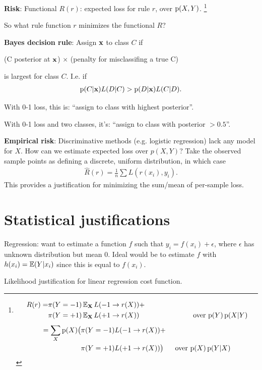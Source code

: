 \documentclass[12pt]{article}
\begin{document}
\textbf{Risk}: Functional $R(r)$: expected loss for rule $r$, over $\operatorname{\text{p}}(X, Y)$.
\footnote{
\begin{align*}
  R(r) = &\pi(Y=-1)\operatorname{\mathbb{E}}_\mathbf X L(-1 \to r(X)) + \\
         &\pi(Y=+1)\operatorname{\mathbb{E}}_\mathbf X L(+1 \to r(X))~~~~~~~~~~~~~~~~~~~~~~~\text{over $\operatorname{\text{p}}(Y)\operatorname{\text{p}}(X|Y)$}
\end{align*}
\begin{align*}
  = \sum_X \operatorname{\text{p}}(X)\big(&\pi(Y=-1)L(-1 \to r(X)) + \\
                     &\pi(Y=+1)L(+1 \to r(X))\big)~~~~~\text{over $\operatorname{\text{p}}(X)\operatorname{\text{p}}(Y|X)$}
\end{align*}
}

So what rule function $r$ minimizes the functional $R$?

\textbf{Bayes decision rule}: Assign $\mathbf x$ to class $C$ if

\begin{center}
(C posterior at $\mathbf x$) $\times$ (penalty for misclassifing a true C)
\end{center}

is largest for class $C$. I.e. if
\begin{align*}
  \operatorname{\text{p}}(C|\mathbf x)L(D|C) > \operatorname{\text{p}}(D|\mathbf x)L(C|D).
\end{align*}

With 0-1 loss, this is: ``assign to class with highest posterior''.

With 0-1 loss and two classes, it's: ``assign to class with posterior $> 0.5$''.

\textbf{Empirical risk}: Discriminative methods (e.g. logistic regression) lack
any model for $X$. How can we estimate expected loss over $p(X,Y)$? Take the
observed sample points as defining a discrete, uniform distribution, in which
case
\begin{align*}
  \hat R(r) = \frac{1}{n}\sum L(r(x_i), y_i).
\end{align*}
This provides a justification for minimizing the sum/mean of per-sample loss.

\newpage
\section*{Statistical justifications}

Regression: want to estimate a function $f$ such that
$y_i = f(x_i) + \epsilon$, where $\epsilon$ has unknown distribution but mean
0. Ideal would be to estimate $f$ with $h(x_i) = \operatorname{\mathbb{E}}(Y|x_i)$ since this is equal
to $f(x_i)$.

Likelihood justification for linear regression cost function.
\end{document}
